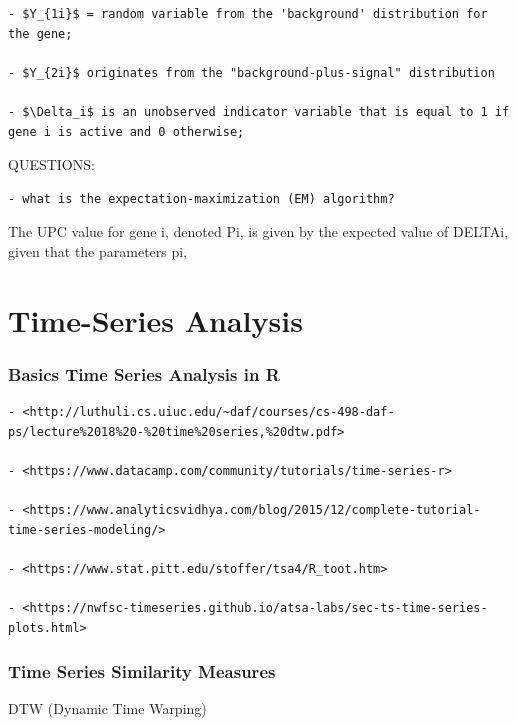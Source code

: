 \documentclass[
]{book}
\begin{document}
\begin{verbatim}
- $Y_{1i}$ = random variable from the 'background' distribution for the gene;

- $Y_{2i}$ originates from the "background-plus-signal" distribution

- $\Delta_i$ is an unobserved indicator variable that is equal to 1 if gene i is active and 0 otherwise;
\end{verbatim}

QUESTIONS:

\begin{verbatim}
- what is the expectation-maximization (EM) algorithm?
\end{verbatim}

The UPC value for gene i, denoted Pi, is given by the expected value of DELTAi, given that the parameters pi,

\hypertarget{time-series-analysis}{%
\section{Time-Series Analysis}\label{time-series-analysis}}

\hypertarget{basics-time-series-analysis-in-r}{%
\subsubsection{Basics Time Series Analysis in R}\label{basics-time-series-analysis-in-r}}

\begin{verbatim}
- <http://luthuli.cs.uiuc.edu/~daf/courses/cs-498-daf-ps/lecture%2018%20-%20time%20series,%20dtw.pdf>

- <https://www.datacamp.com/community/tutorials/time-series-r>

- <https://www.analyticsvidhya.com/blog/2015/12/complete-tutorial-time-series-modeling/>

- <https://www.stat.pitt.edu/stoffer/tsa4/R_toot.htm>

- <https://nwfsc-timeseries.github.io/atsa-labs/sec-ts-time-series-plots.html>  
\end{verbatim}

\hypertarget{time-series-similarity-measures}{%
\subsubsection{Time Series Similarity Measures}\label{time-series-similarity-measures}}

DTW (Dynamic Time Warping)
\end{document}
